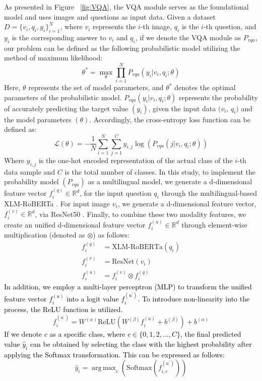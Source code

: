 \documentclass[letterpaper]{article} %
\newcommand{\mj}[1]{\textcolor{black}{#1}}
\DeclareMathOperator*{\argmax}{arg\,max}
\begin{document}
As presented in Figure ~\ref{fig:VQA}, the VQA module serves as the foundational model and uses images and questions as input data. Given a dataset $D = \{v_i, q_i, y_i\}_{i=1}^N$, where $v_i$ represents the $i$-th image, $q_i$ is the $i$-th question, and $y_i$ is the corresponding answer to $v_i$ and $q_i$, if we denote the VQA module as $P_{vqa}$, our problem can be defined as the following probabilistic model utilizing the method of maximum likelihood:
\begin{equation}
\theta^{*} = \max_{\theta}\prod_{i=1}^N P_{vqa}(y_i | v_i, q_i; \theta)
\end{equation}
Here, $\theta$ represents the set of model parameters, and $\theta^*$ denotes the optimal parameters of the probabilistic model. $P_{vqa}(y_i | v_i, q_i; \theta)$ represents the probability of accurately predicting the target value $(y_i)$, given the input data $(v_i$, $q_i)$ and the model parameters $(\theta)$. Accordingly, the cross-entropy loss function can be defined as:
\begin{equation}
\mathcal{L}(\theta) = - \frac{1}{N} \sum_{i=1}^{N} \sum_{j=1}^{C} y_{i, j} \log(P_{vqa}(j | v_i, q_i; \theta))
\end{equation}
Where $y_{i,j}$ is the one-hot encoded representation of the actual class of the $i$-th data sample and $C$ is the total number of classes. In this study, to implement the probability model $(P_{vqa})$ as a multilingual model, we generate a d-dimensional feature vector $f_i^{(q)} \in \mathbb{R}^d$, for the input question $q_i$ through the multilingual-based XLM-RoBERTa \cite{xlmroberta}. For input image $v_i$, we generate a d-dimensional feature vector, $f_i^{(v)} \in \mathbb{R}^d$, via ResNet50 \cite{resnet}. Finally, to combine these two modality features, we create an unified d-dimensional feature vector $f_i^{(u)} \in \mathbb{R}^d$ through element-wise multiplication (denoted as $\otimes$) as follows:
\begin{align}
f^{(q)}_i &= \text{XLM-RoBERTa}(q_i) \\
f^{(v)}_i &= \text{ResNet}(v_i)\\
f^{(u)}_i &= f^{(v)}_i \otimes f^{(q)}_i
\end{align}
\mj{In addition, we employ a multi-layer perceptron (MLP) to transform the unified feature vector $f^{(u)}_i$ into a logit value $f^{(u^\prime)}_i$. To introduce non-linearity into the process, the ReLU function is utilized.}
\begin{equation}
f^{(u^\prime)}_i = W^{(\alpha)}\text{ReLU}(W^{(\beta)}f^{(u)}_i+b^{(\beta)})+b^{(\alpha)}
\end{equation}
\mj{If we denote $c$ as a specific class, where $c \in \{0, 1, 2, ..., C\}$, the final predicted value $\hat{y}_i$ can be obtained by selecting the class with the highest probability after applying the Softmax transformation. This can be expressed as follows:}
\begin{equation}
\hat{y}_{i} = \argmax_{c}(\text{Softmax}(f^{(u^\prime)}_{i,c}))
\end{equation}
\end{document}
